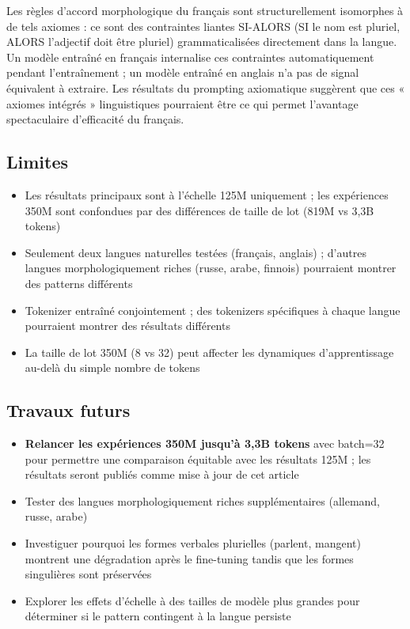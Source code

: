 \documentclass[11pt,a4paper]{article}
\begin{document}
Les règles d'accord morphologique du français sont structurellement isomorphes à de tels axiomes : ce sont des contraintes liantes SI-ALORS (SI le nom est pluriel, ALORS l'adjectif doit être pluriel) grammaticalisées directement dans la langue. Un modèle entraîné en français internalise ces contraintes automatiquement pendant l'entraînement ; un modèle entraîné en anglais n'a pas de signal équivalent à extraire. Les résultats du prompting axiomatique suggèrent que ces « axiomes intégrés » linguistiques pourraient être ce qui permet l'avantage spectaculaire d'efficacité du français.

\subsection{Limites}

\begin{itemize}
    \item Les résultats principaux sont à l'échelle 125M uniquement ; les expériences 350M sont confondues par des différences de taille de lot (819M vs 3,3B tokens)
    \item Seulement deux langues naturelles testées (français, anglais) ; d'autres langues morphologiquement riches (russe, arabe, finnois) pourraient montrer des patterns différents
    \item Tokenizer entraîné conjointement ; des tokenizers spécifiques à chaque langue pourraient montrer des résultats différents
    \item La taille de lot 350M (8 vs 32) peut affecter les dynamiques d'apprentissage au-delà du simple nombre de tokens
\end{itemize}

\subsection{Travaux futurs}

\begin{itemize}
    \item \textbf{Relancer les expériences 350M jusqu'à 3,3B tokens} avec batch=32 pour permettre une comparaison équitable avec les résultats 125M ; les résultats seront publiés comme mise à jour de cet article
    \item Tester des langues morphologiquement riches supplémentaires (allemand, russe, arabe)
    \item Investiguer pourquoi les formes verbales plurielles (parlent, mangent) montrent une dégradation après le fine-tuning tandis que les formes singulières sont préservées
    \item Explorer les effets d'échelle à des tailles de modèle plus grandes pour déterminer si le pattern contingent à la langue persiste
\end{itemize}
\end{document}
